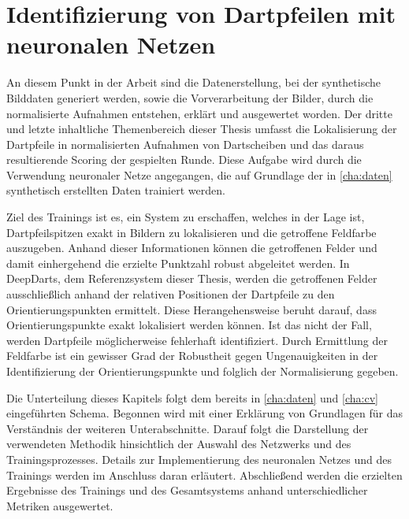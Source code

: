 
\chapter{Identifizierung von Dartpfeilen mit neuronalen Netzen}
\label{cha:ki}

An diesem Punkt in der Arbeit sind die Datenerstellung, bei der synthetische Bilddaten generiert werden, sowie die Vorverarbeitung der Bilder, durch die normalisierte Aufnahmen entstehen, erklärt und ausgewertet worden. Der dritte und letzte inhaltliche Themenbereich dieser Thesis umfasst die Lokalisierung der Dartpfeile in normalisierten Aufnahmen von Dartscheiben und das daraus resultierende Scoring der gespielten Runde. Diese Aufgabe wird durch die Verwendung neuronaler Netze angegangen, die auf Grundlage der in \autoref{cha:daten} synthetisch erstellten Daten trainiert werden.

Ziel des Trainings ist es, ein System zu erschaffen, welches in der Lage ist, Dartpfeilspitzen exakt in Bildern zu lokalisieren und die getroffene Feldfarbe auszugeben. Anhand dieser Informationen können die getroffenen Felder und damit einhergehend die erzielte Punktzahl robust abgeleitet werden. In DeepDarts, dem Referenzsystem dieser Thesis, werden die getroffenen Felder ausschließlich anhand der relativen Positionen der Dartpfeile zu den Orientierungspunkten ermittelt. Diese Herangehensweise beruht darauf, dass Orientierungspunkte exakt lokalisiert werden können. Ist das nicht der Fall, werden Dartpfeile möglicherweise fehlerhaft identifiziert. Durch Ermittlung der Feldfarbe ist ein gewisser Grad der Robustheit gegen Ungenauigkeiten in der Identifizierung der Orientierungspunkte und folglich der Normalisierung gegeben.

Die Unterteilung dieses Kapitels folgt dem bereits in \autoref{cha:daten} und \autoref{cha:cv} eingeführten Schema. Begonnen wird mit einer Erklärung von Grundlagen für das Verständnis der weiteren Unterabschnitte. Darauf folgt die Darstellung der verwendeten Methodik hinsichtlich der Auswahl des Netzwerks und des Trainingsprozesses. Details zur Implementierung des neuronalen Netzes und des Trainings werden im Anschluss daran erläutert. Abschließend werden die erzielten Ergebnisse des Trainings und des Gesamtsystems anhand unterschiedlicher Metriken ausgewertet.





